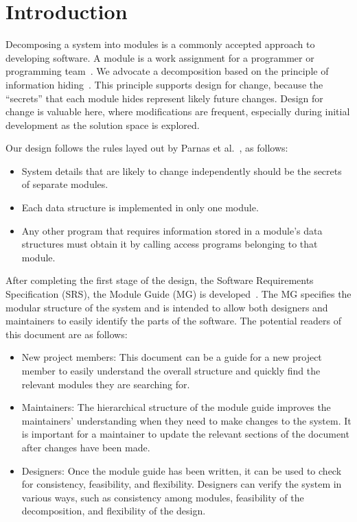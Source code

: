 \documentclass[12pt, titlepage]{article}
\begin{document}
\newpage

\tableofcontents

\listoftables

\listoffigures

\newpage


\section{Introduction} \label{SecIntro}

Decomposing a system into modules is a commonly accepted approach to developing
software.  A module is a work assignment for a programmer or programming
team~\citep{ParnasEtAl1984}.  We advocate a decomposition
based on the principle of information hiding~\citep{Parnas1972a}.  This
principle supports design for change, because the ``secrets'' that each module
hides represent likely future changes.  Design for change is valuable here,
where modifications are frequent, especially during initial development as the
solution space is explored.  

Our design follows the rules layed out by Parnas et al.~\citep{ParnasEtAl1984}, as follows:
\begin{itemize}
\item System details that are likely to change independently should be the
  secrets of separate modules.
\item Each data structure is implemented in only one module.
\item Any other program that requires information stored in a module's data
  structures must obtain it by calling access programs belonging to that module.
\end{itemize}

After completing the first stage of the design, the Software Requirements
Specification (SRS), the Module Guide (MG) is developed~\citep{ParnasEtAl1984}. The MG
specifies the modular structure of the system and is intended to allow both
designers and maintainers to easily identify the parts of the software.  The
potential readers of this document are as follows:

\begin{itemize}
\item New project members: This document can be a guide for a new project member
  to easily understand the overall structure and quickly find the
  relevant modules they are searching for.
\item Maintainers: The hierarchical structure of the module guide improves the
  maintainers' understanding when they need to make changes to the system. It is
  important for a maintainer to update the relevant sections of the document
  after changes have been made.
\item Designers: Once the module guide has been written, it can be used to
  check for consistency, feasibility, and flexibility. Designers can verify the
  system in various ways, such as consistency among modules, feasibility of the
  decomposition, and flexibility of the design.
\end{itemize}
\end{document}

